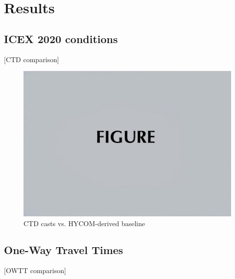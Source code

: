 \section{\label{sec:3} Results}

\subsection{\label{subsec:3:1} ICEX 2020 conditions}
{\color{red}[CTD comparison]}

\begin{figure}[ht]
\includegraphics[width=\reprintcolumnwidth]{figsamp.jpg}
\caption{\label{fig:FIG2}{CTD casts vs. HYCOM-derived baseline}}
\end{figure}

\subsection{\label{subsec:3:2} One-Way Travel Times}
{\color{red}[OWTT comparison]}

